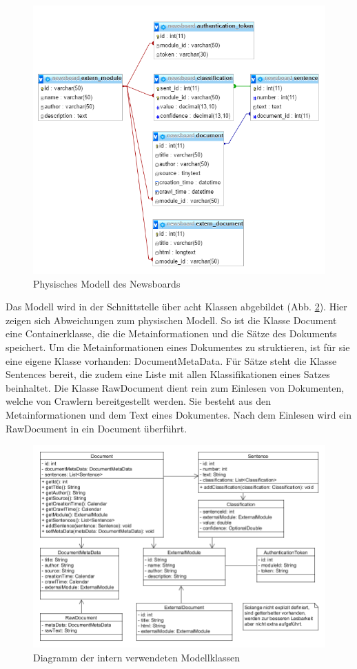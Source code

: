 \begin{figure}[h]
	\centering
	\includegraphics[scale=0.8]{content/physical-model.png}
	\caption{Physisches Modell des Newsboards}
	\label{physical_model}
\end{figure}

Das Modell wird in der Schnittstelle über acht Klassen abgebildet (Abb. \ref{uml_model}).
Hier zeigen sich Abweichungen zum physischen Modell. So ist die Klasse Document eine
Containerklasse, die die Metainformationen und die Sätze des Dokuments speichert. Um die
Metainformationen eines Dokumentes zu struktieren, ist für sie eine eigene Klasse vorhanden:
DocumentMetaData. Für Sätze steht die Klasse Sentences bereit, die zudem eine Liste mit
allen Klassifikationen eines Satzes beinhaltet. Die  Klasse RawDocument dient rein zum
Einlesen von Dokumenten, welche von Crawlern bereitgestellt werden. Sie besteht aus den
Metainformationen und dem Text eines Dokumentes. Nach dem Einlesen wird ein RawDocument in
ein Document überführt.

\begin{figure}[h]
	\centering
	\includegraphics[scale=0.5]{content/uml-model.png}
	\caption{Diagramm der intern verwendeten Modellklassen}
	\label{uml_model}
\end{figure}


